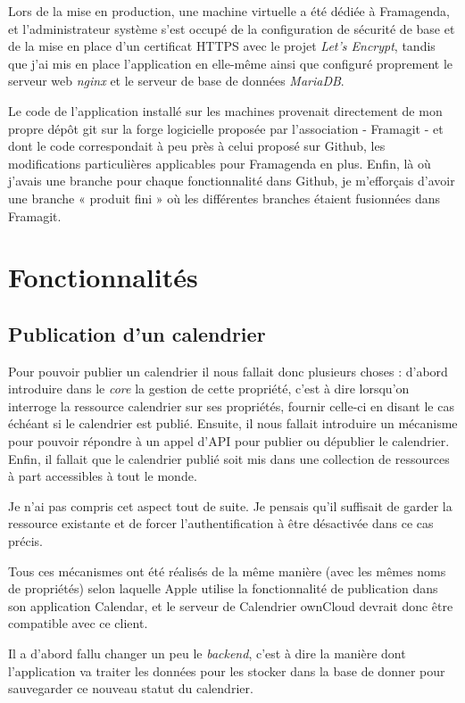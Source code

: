\documentclass[10pt,a4paper, twoside]{report}
\begin{document}
	Lors de la mise en production, une machine virtuelle a été dédiée à Framagenda, et l'administrateur système s'est occupé de la configuration de sécurité de base et de la mise en place d'un certificat \textsc{HTTPS} avec le projet \textit{Let's Encrypt}, tandis que j'ai mis en place l'application en elle-même ainsi que configuré proprement le serveur web \textit{nginx} et le serveur de base de données \textit{MariaDB}.
	
	Le code de l'application installé sur les machines provenait directement de mon propre dépôt git sur la forge logicielle proposée par l'association - Framagit - et dont le code correspondait à peu près à celui proposé sur Github, les modifications particulières applicables pour Framagenda en plus. Enfin, là où j'avais une branche pour chaque fonctionnalité dans Github, je m'efforçais d'avoir une branche « produit fini » où les différentes branches étaient fusionnées dans Framagit.
	
	\section{Fonctionnalités}
	\subsection{Publication d'un calendrier}
	Pour pouvoir publier un calendrier il nous fallait donc plusieurs choses : d'abord introduire dans le \textit{core} la gestion de cette propriété, c'est à dire lorsqu'on interroge la ressource calendrier sur ses propriétés, fournir celle-ci en disant le cas échéant si le calendrier est publié.
	Ensuite, il nous fallait introduire un mécanisme pour pouvoir répondre à un appel d'API pour publier ou dépublier le calendrier. Enfin, il fallait que le calendrier publié soit mis dans une collection de ressources à part accessibles à tout le monde.
	
	Je n'ai pas compris cet aspect tout de suite. Je pensais qu'il suffisait de garder la ressource existante et de forcer l'authentification à être désactivée dans ce cas précis.
	
	Tous ces mécanismes ont été réalisés de la même manière (avec les mêmes noms de propriétés) selon laquelle Apple utilise la fonctionnalité de publication dans son application Calendar, et le serveur de Calendrier ownCloud devrait donc être compatible avec ce client.
	
	Il a d'abord fallu changer un peu le \textit{backend}, c'est à dire la manière dont l'application va traiter les données pour les stocker dans la base de donner pour sauvegarder ce nouveau statut du calendrier.
	
\end{document}
